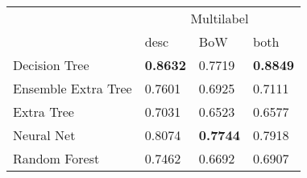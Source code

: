 \begin{tabular}{|l|l|l|l| }
\hline
 &  \multicolumn{3}{c|}{Multilabel} \\
\cline{2-4} & desc & BoW & both \\ \hline
Decision Tree       & {\bf 0.8632} & 0.7719 & {\bf 0.8849}\\
Ensemble Extra Tree & 0.7601 & 0.6925 & 0.7111\\
Extra Tree          & 0.7031 & 0.6523 & 0.6577\\
Neural Net          & 0.8074 & {\bf 0.7744} & 0.7918\\
Random Forest       & 0.7462 & 0.6692 & 0.6907\\
\hline
\end{tabular}